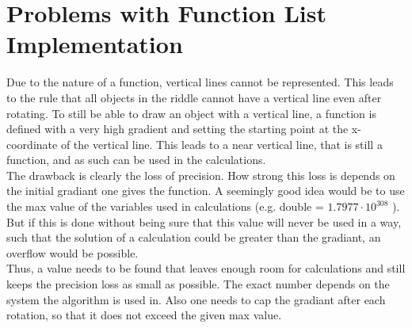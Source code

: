 \section{Problems with Function List Implementation}
Due to the nature of a function, vertical lines cannot be represented. This leads to the rule that all objects in the riddle cannot have a vertical line even after rotating. 
To still be able to draw an object with a vertical line, a function is defined with a very high gradient and setting the starting point at the x-coordinate of the vertical line. This leads to a near vertical line, that is still a function, and as such can be used in the calculations.\\
The drawback is clearly the loss of precision. How strong this loss is depends on the initial gradiant one gives the function. A seemingly good idea would be to use the max value of the variables used in calculations (e.g. double = $1.7977 \cdot 10^{308}$ ). But if this is done without being sure that this value will never be used in a way, such that the solution of a calculation could be greater than the gradiant, an overflow would be possible.\\
Thus, a value needs to be found that leaves enough room for calculations and still keeps the precision loss as small as possible. The exact number depends on the system the algorithm is used in. Also one needs to cap the gradiant after each rotation, so that it does not exceed the given max value.


